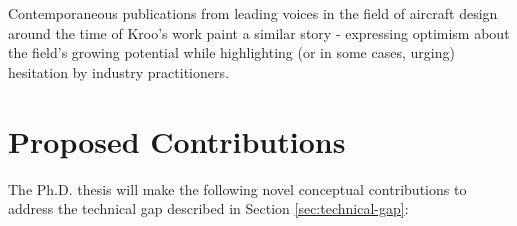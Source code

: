 \documentclass[12pt,vi,oneside]{report}
\begin{document}




    Contemporaneous publications from leading voices in the field of aircraft design around the time of Kroo's work paint a similar story - expressing optimism about the field's growing potential while highlighting (or in some cases, urging) hesitation by industry practitioners.



    \section{Proposed Contributions}
    \label{sec:contributions}

    The Ph.D. thesis will make the following novel conceptual contributions to address the technical gap described in Section \ref{sec:technical-gap}:
\end{document}

